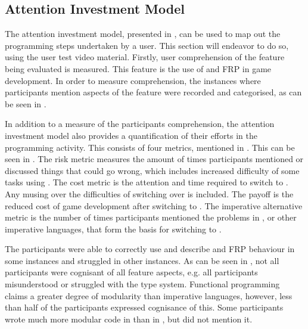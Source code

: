 \subsection{Attention Investment Model}
The attention investment model, presented in , can be used to map out the programming steps undertaken by a user. This section will endeavor to do so, using the user test video material. Firstly, user comprehension of the feature being evaluated is measured. This feature is the use of \fsh and \gls{FRP} in game development. In order to measure comprehension, the instances where participants mention aspects of the feature were recorded and categorised, as can be seen in .


In addition to a measure of the participants comprehension, the attention investment model also provides a quantification of their efforts in the programming activity. This consists of four metrics, mentioned in . This can be seen in . The risk metric measures the amount of times participants mentioned or discussed things that could go wrong, which includes increased difficulty of some tasks using \fsh. The cost metric is the attention and time required to switch to \fsh. Any musing over the difficulties of switching over is included. The payoff is the reduced cost of game development after switching to \fsh. The imperative alternative metric is the number of times participants mentioned the problems in \csh, or other imperative languages, that form the basis for switching to \fsh.


The participants were able to correctly use and describe \fsh and \gls{FRP} behaviour in some instances and struggled in other instances. As can be seen in , not all participants were cognisant of all feature aspects, e.g. all participants misunderstood or struggled with the type system. Functional programming claims a greater degree of modularity than imperative languages\cite{hughes1989functional}, however, less than half of the participants expressed cognisance of this. Some participants wrote much more modular code in \fsh than in \csh, but did not mention it.

